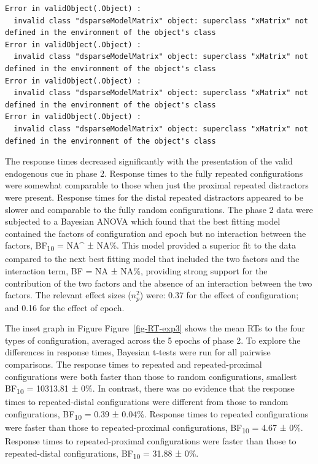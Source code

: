 \documentclass[
  man,
  floatsintext,
  longtable,
  nolmodern,
  notxfonts,
  notimes,
  colorlinks=true,linkcolor=blue,citecolor=blue,urlcolor=blue]{apa7}
\begin{document}
\begin{verbatim}
Error in validObject(.Object) : 
  invalid class "dsparseModelMatrix" object: superclass "xMatrix" not defined in the environment of the object's class
Error in validObject(.Object) : 
  invalid class "dsparseModelMatrix" object: superclass "xMatrix" not defined in the environment of the object's class
Error in validObject(.Object) : 
  invalid class "dsparseModelMatrix" object: superclass "xMatrix" not defined in the environment of the object's class
Error in validObject(.Object) : 
  invalid class "dsparseModelMatrix" object: superclass "xMatrix" not defined in the environment of the object's class
\end{verbatim}

The response times decreased significantly with the presentation of the
valid endogenous cue in phase 2. Response times to the fully repeated
configurations were somewhat comparable to those when just the proximal
repeated distractors were present. Response times for the distal
repeated distractors appeared to be slower and comparable to the fully
random configurations. The phase 2 data were subjected to a Bayesian
ANOVA which found that the best fitting model contained the factors of
configuration and epoch but no interaction between the factors,
BF\textsubscript{10} = NA\^{} ± NA\%. This model provided a superior fit
to the data compared to the next best fitting model that included the
two factors and the interaction term, BF = NA ± NA\%, providing strong
support for the contribution of the two factors and the absence of an
interaction between the two factors. The relevant effect sizes
(\(n^2_p\)) were: 0.37 for the effect of configuration; and 0.16 for the
effect of epoch.

The inset graph in Figure Figure~\ref{fig-RT-exp3} shows the mean RTs to
the four types of configuration, averaged across the 5 epochs of phase
2. To explore the differences in response times, Bayesian t-tests were
run for all pairwise comparisons. The response times to repeated and
repeated-proximal configurations were both faster than those to random
configurations, smallest BF\textsubscript{10} = 10313.81 ± 0\%. In
contrast, there was no evidence that the response times to
repeated-distal configurations were different from those to random
configurations, BF\textsubscript{10} = 0.39 ± 0.04\%. Response times to
repeated configurations were faster than those to repeated-proximal
configurations, BF\textsubscript{10} = 4.67 ± 0\%. Response times to
repeated-proximal configurations were faster than those to
repeated-distal configurations, BF\textsubscript{10} = 31.88 ± 0\%.
\end{document}
